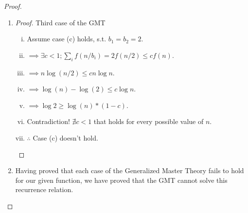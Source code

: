 \documentclass{article}
\begin{document}
\begin{proof}
\begin{enumerate}
\begin{proof}
\begin{enumerate}[(i)]
                              \item Contradiction! This violates the definition of Big
                                    Theta notation.
                              \item \(\therefore \) case (b) doesn't hold.
                        \end{enumerate}
                  \end{proof}
            \item \begin{proof} Third case of the GMT
                        \begin{enumerate}[(i)]
                              \item Assume case (c) holds, s.t. \(b_1 = b_2 = 2\).
                              \item \( \implies \exists c < 1; \sum_i f(n/ b_i) = 2f(n/2) \leq cf(n)\).
                              \item \( \implies n \log (n/2) \leq  cn \log n \).
                              \item \( \implies \log (n) - \log (2) \leq c \log n\).
                              \item \( \implies \log 2 \geq \log (n) * (1-c)\).
                              \item Contradiction! \( \nexists c < 1\) that holds for
                                    every possible value of \(n\).
                              \item \( \therefore \) Case (c) doesn't hold.
                        \end{enumerate}
                  \end{proof}
            \item Having proved that each case of the Generalized Master Theory fails to
                  hold for our given function, we have proved that the GMT cannot solve
                  this recurrence relation.
      \end{enumerate}
\end{proof}
\end{document}
